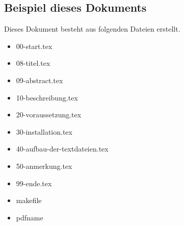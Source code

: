 \subsection{Beispiel dieses Dokuments}

Dieses Dokument besteht aus folgenden Dateien erstellt.

\begin{itemize}
	\item 00-start.tex
	\item 08-titel.tex
	\item 09-abstract.tex
	\item 10-beschreibung.tex
	\item 20-voraussetzung.tex
	\item 30-installation.tex
	\item 40-aufbau-der-textdateien.tex
	\item 50-anmerkung.tex
	\item 99-ende.tex
	\item makefile
	\item pdfname
\end{itemize}


